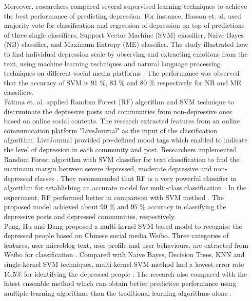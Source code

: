 \documentclass[12pt]{article}
\begin{document}
Moreover, researchers compared several supervised learning techniques to achieve the best performance of predicting depression. For instance, Hassan et, al. \cite{Hassan} used majority vote for classification and regression of depression on top of predictions of three single classifiers, Support Vector Machine (SVM) classifier, Naive Bayes (NB) classifier, and Maximum Entropy (ME) classifier. The study illustrated how to find individual depression scale by observing and extracting emotions from the text, using machine learning techniques and natural language processing techniques on different social media platforms \cite{Hassan}. The performance was observed that the accuracy of SVM is 91 \%,  83 \% and 80 \% respectively for NB and ME classifiers.
\\

Fatima et, al. \cite{Fatima} applied Random Forest (RF) algorithm and SVM technique to discriminate the depressive posts and communities from non-depressive ones based on online social contents. The research extracted features from an online communication platform "LiveJournal" as the input of the classification algorithm. LiveJournal provided pre-defined mood tags which enabled to indicate the level of depression in each community and post. Researchers implemented Random Forest algorithm with SVM classifier for text classification to find the maximum margin between severe depressed, moderate depressive and non-depressed classes \cite{Fatima}. They recommended that RF is a very powerful classifier in algorithm for establishing an accurate model for multi-class classification \cite{Fatima}. In the experiment, RF performed better in comparison with SVM method \cite{Fatima}. The proposed model achieved about 90 \% and 95 \% accuracy in classifying the depressive posts and depressed communities, respectively.
\\

Peng, Hu and Dang \cite{Peng} proposed a multi-kernel SVM based model to recognise the depressed people based on Chinese social media Weibo. Three categories of features, user microblog text, user profile and user behaviours, are extracted from Weibo for classification \cite{Peng}. Compared with Naive Bayes, Decision Trees, KNN and single-kernel SVM techniques, multi-kernel SVM method had a lowest error rate 16.5\% for identifying the depressed people \cite{Peng}. The research also compared with the latest ensemble method which can obtain better predictive performance using multiple learning algorithms than the traditional learning algorithms alone \cite{Peng}.
\\
\end{document}
